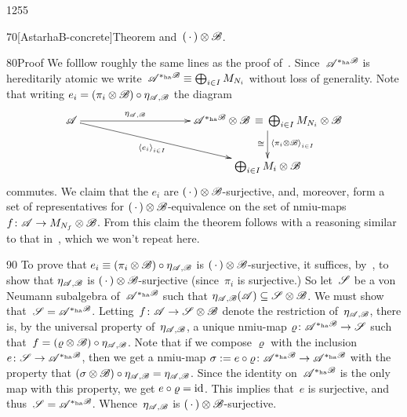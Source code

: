 \begin{parsec}{1255}
\begin{point}{70}[AstarhaB-concrete]{Theorem}
and~$(\,\cdot\,)\otimes\mathscr{B}$.
\begin{point}{80}{Proof}%
We folllow roughly the same lines
    as the proof of~.
Since~$\mathscr{A}^{*_\mathrm{ha}\mathscr{B}}$
is hereditarily atomic
we write~$\mathscr{A}^{*_\mathrm{ha}\mathscr{B}}
\equiv \bigoplus_{i\in I} M_{N_i}$
without loss of generality.
Note that writing $e_i = (\pi_i\otimes \mathscr{B})\circ \eta_{\mathscr{A},\mathscr{B}}$
the diagram
\begin{equation*}
\xymatrix@C=10em{
\scrA
    \ar[r]^-{\eta_{\scrA,\scrB}}
    \ar[rd]_-{\left<e_i\right>_{i\in I}}
&
\scrA^{*_\mathrm{ha}\scrB}\otimes \scrB
    \,\equiv\, \bigoplus_{i\in I}M_{N_i}\otimes \scrB
    \ar[d]_{\cong}^{\left<\pi_i\otimes \scrB\right>_{i \in I}}
\\
&
\bigoplus_{i \in I} M_i\otimes \scrB
}
\end{equation*}
commutes.
We claim that the $e_i$ are $(\,\cdot\,)\otimes \mathscr{B}$-surjective,
and, moreover,
form a set of representatives
for $(\,\cdot\,)\otimes \mathscr{B}$-equivalence
on the set of nmiu-maps
    $f\colon \mathscr{A}\to M_{N_f}\otimes \mathscr{B}$.
From this claim the theorem follows
with a reasoning similar to that
in~, which we won't repeat here.
\begin{point}{90}
To prove that $e_i\equiv (\pi_i \otimes \mathscr{B})\circ \eta_{\mathscr{A},\mathscr{B}}$
is $(\,\cdot\,)\otimes\mathscr{B}$-surjective,
it suffices,
by~,
to show that $\eta_{\mathscr{A},\mathscr{B}}$
is $(\,\cdot\,)\otimes \mathscr{B}$-surjective
(since~$\pi_i$ is surjective.)
So let~$\mathscr{S}$ be a von Neumann subalgebra of~$\mathscr{A}^{*_\mathrm{ha}\mathscr{B}}$
such that $\eta_{\mathscr{A},\mathscr{B}}(\mathscr{A})\subseteq
\mathscr{S} \otimes \mathscr{B}$.
We must show that~$\mathscr{S} = \mathscr{A}^{*_\mathrm{ha}\mathscr{B}}$.
Letting~$f\colon \mathscr{A}\to\mathscr{S}\otimes \mathscr{B}$
denote the restriction of~$\eta_{\mathscr{A},\mathscr{B}}$,
there is, by the universal property of~$\eta_{\mathscr{A},\mathscr{B}}$,
a unique nmiu-map $\varrho\colon \mathscr{A}^{*_\mathrm{ha}\mathscr{B}}
\to \mathscr{S}$
such that~$f= (\varrho\otimes \mathscr{B}) \circ \eta_{\mathscr{A},\mathscr{B}}$.
Note that if we compose $\varrho$ with the inclusion
    $e\colon \mathscr{S}\to \mathscr{A}^{*_\mathrm{ha}\mathscr{B}}$,
    then
we get a nmiu-map $\sigma := e\circ \varrho\colon 
    \mathscr{A}^{*_\mathrm{ha}\mathscr{B}}
    \to\mathscr{A}^{*_\mathrm{ha}\mathscr{B}}$
    with the property
    that 
    $(\sigma\otimes\mathscr{B})\circ \eta_{\mathscr{A},\mathscr{B}} = \eta_{\mathscr{A},\mathscr{B}}$.
Since the identity on~$\mathscr{A}^{*_\mathrm{ha}\mathscr{B}}$
is the only map with this property,
we get $e \circ \varrho = \mathrm{id}$.
This implies that~$e$ is surjective,
and thus~$\mathscr{S}=
    \mathscr{A}^{*_\mathrm{ha}\mathscr{B}}$.
    Whence~$\eta_{\mathscr{A},\mathscr{B}}$
    is $(\,\cdot\,)\otimes \mathscr{B}$-surjective.


\end{point}
\end{point}
\end{point}
\end{parsec}
